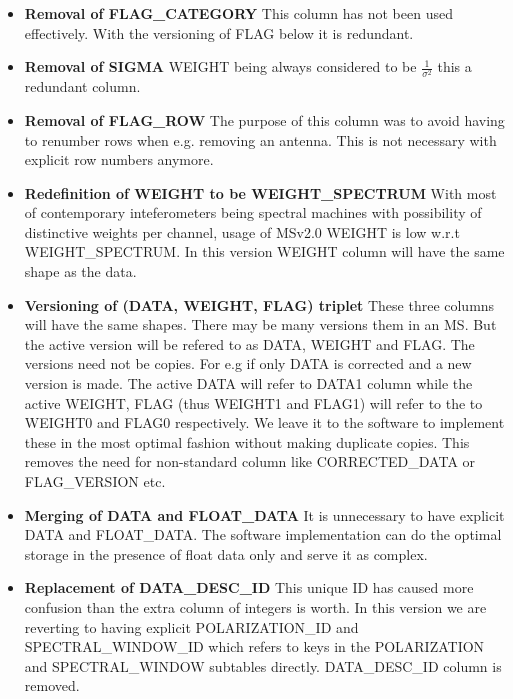 \documentclass{article}
\begin{document}
\begin{itemize}

\item{{\bf Removal of FLAG\_CATEGORY}
    This column has not been used effectively. With the versioning of
    FLAG below it is redundant. }

\item{{\bf Removal of SIGMA} WEIGHT being always considered to be
    $\frac{1}{\sigma^2}$ this a redundant column.}

\item{{\bf Removal of FLAG\_ROW}
    The purpose of this column was to avoid having to renumber rows when e.g.
    removing an antenna. This is not necessary with explicit row numbers
    anymore. }

\item{{\bf Redefinition of WEIGHT to be WEIGHT\_SPECTRUM} With most of
    contemporary inteferometers being spectral machines with
    possibility of distinctive weights per channel, usage of MSv2.0
    WEIGHT is low w.r.t WEIGHT\_SPECTRUM. In this version WEIGHT
    column will have the same shape as the data.  }

\item{{\bf Versioning of (DATA, WEIGHT, FLAG) triplet} These three
    columns will have the same shapes. There may be many versions them
    in an MS. But the active version will be refered to as DATA,
    WEIGHT and FLAG.  The versions need not be copies. For e.g if only
    DATA is corrected and a new version is made. The active DATA will
    refer to DATA1 column while the active WEIGHT, FLAG (thus WEIGHT1
    and FLAG1) will refer to the to WEIGHT0 and FLAG0 respectively. We
    leave it to the software to implement these in the most optimal
    fashion without making duplicate copies. This removes the need for
    non-standard column like CORRECTED\_DATA or FLAG\_VERSION etc. }

\item{{\bf Merging of DATA and FLOAT\_DATA} It is unnecessary to have
    explicit DATA and FLOAT\_DATA. The software implementation can do
    the optimal storage in the presence of float data only and serve
    it as complex.  }

\item{{\bf Replacement of DATA\_DESC\_ID} This unique ID has caused
    more confusion than the extra column of integers is worth. In this
    version we are reverting to having explicit POLARIZATION\_ID and
    SPECTRAL\_WINDOW\_ID which refers to keys in the POLARIZATION and
    SPECTRAL\_WINDOW subtables directly. DATA\_DESC\_ID column is
    removed.}

\end{itemize}
\end{document}
